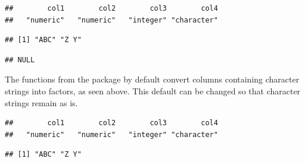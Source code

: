 \documentclass[krantz2]{krantz}\usepackage{knitr}
\begin{document}
\begin{knitrout}\footnotesize
{}\color{fgcolor}\begin{kframe}
\begin{alltt}
 \hlkwb{<-} \hlstd{(}\hlstd{,}  \hlstd{=} \hlstd{)}
\end{alltt}
\begin{verbatim}
##        col1        col2        col3        col4 
##   "numeric"   "numeric"   "integer" "character"
\end{verbatim}
\begin{alltt}
\hlstd{from_csv_e.df[[}\hlstd{]]}
\end{alltt}
\begin{verbatim}
## [1] "ABC" "Z Y"
\end{verbatim}
\begin{alltt}
\hlstd{(from_csv_e.df[[}\hlstd{]])}
\end{alltt}
\begin{verbatim}
## NULL
\end{verbatim}
\end{kframe}
\end{knitrout}

The functions from the \Rlang {} package by default convert columns containing character strings into factors, as seen above. This default can be changed so that character strings remain as is.

\begin{knitrout}\footnotesize
{}\color{fgcolor}\begin{kframe}
\begin{alltt}
 \hlkwb{<-} \hlstd{(}\hlstd{,}
                           \hlstd{=} \hlstd{)}
\end{alltt}
\end{kframe}
\end{knitrout}

\begin{knitrout}\footnotesize
{}\color{fgcolor}\begin{kframe}
\begin{alltt}
\end{alltt}
\begin{verbatim}
##        col1        col2        col3        col4 
##   "numeric"   "numeric"   "integer" "character"
\end{verbatim}
\begin{alltt}
\hlstd{from_csv_c.df[[}\hlstd{]]}
\end{alltt}
\begin{verbatim}
## [1] "ABC" "Z Y"
\end{verbatim}
\end{kframe}
\end{knitrout}
\end{document}
